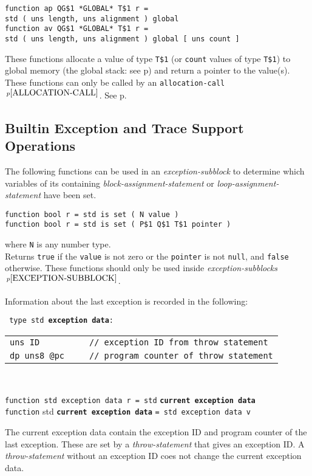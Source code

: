 \documentclass[12pt]{article}
\newcommand{\ttkey}[1]{{\tt \bfseries #1}}
\newcommand{\pagref}[1]{p\pageref{#1}}
\newcommand{\pagnote}[1]{$\,^{p\pageref{#1}}$}
\newenvironment{indpar}[1][0.3in]%
	{\begin{list}{}%
		     {\setlength{\itemsep}{0in}%
		      \setlength{\topsep}{0in}%
		      \setlength{\parsep}{1ex}%
		      \setlength{\labelwidth}{#1}%
		      \setlength{\leftmargin}{#1}%
		      \addtolength{\leftmargin}{\labelsep}}%
	 \item}%
	{\end{list}}
\begin{document}
{\tt function ap QG\$1 *GLOBAL* T\$1 r = \\
\hspace*{1in}std ( uns length, uns alignment ) global}%
\label{GLOBAL} \\
{\tt function av QG\$1 *GLOBAL* T\$1 r = \\
\hspace*{1in}std ( uns length, uns alignment ) global [ uns count ]}
\begin{indpar}
These functions allocate a value of type {\tt T\$1}
(or {\tt count} values of type {\tt T\$1}) to global
memory (the global stack: see \pagref{GLOBAL-MEMORY})
and return a pointer to the value(s).
\\[1ex]
These functions can only be called by an
{\tt allocation-call}\pagnote{ALLOCATION-CALL}.
See \pagref{ALLOCATION-CALLS}.
\end{indpar}

\subsection{Builtin Exception and Trace Support Operations}
\label{BUILTIN-EXCEPTION-AND-TRACE-SUPPORT-OPERATIONS}

The following functions can be used in an {\em exception-subblock}
to determine which variables of its containing
{\em block-assignment-statement} or {\em loop-assignment-statement}
have been set.

{\tt function bool r = std is set ( N value )} \\
{\tt function bool r = std is set ( P\$1 Q\$1 T\$1 pointer )}%
\label{IS-SET}
\begin{indpar}
where {\tt N} is any number type.
\\[1ex]
Returns {\tt true} if the {\tt value} is not zero or the {\tt pointer}
is not {\tt null}, and {\tt false} otherwise. 
These functions should only be used inside
{\em exception-subblocks}\pagnote{EXCEPTION-SUBBLOCK}.
\end{indpar}

Information about the last exception is recorded in the following:

{\tt
type~std~\ttkey{exception data}: \\
\begin{tabular}[t]{@{~~~~~}l}
\tt uns~ID~~~~~~~~~~// exception ID from throw statement \\
\tt dp~uns8~@pc~~~~~// program counter of throw statement\\
\end{tabular} \\
}
{\tt function std exception data r = std} \ttkey{current exception data} \\
{\tt function} std \ttkey{current exception data} {\tt = std exception data v}
\begin{indpar}
The current exception data contain the exception ID and program counter
of the last exception.  These are set by a {\em throw-statement} that
gives an exception ID.   A {\em throw-statement} without an exception ID
coes not change the current exception data.
\end{indpar}
\end{document}
